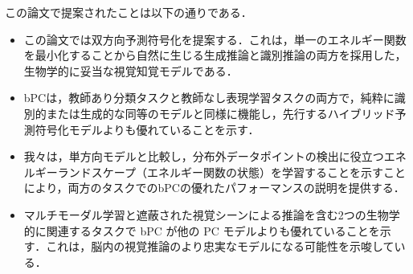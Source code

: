 \documentclass[a4paper, titlepage]{jsarticle}
\begin{document}
\par
この論文で提案されたことは以下の通りである．
\begin{itemize}
   \item この論文では双方向予測符号化を提案する．これは，単一のエネルギー関数を最小化することから自然に生じる生成推論と識別推論の両方を採用した，生物学的に妥当な視覚知覚モデルである．
   \item bPCは，教師あり分類タスクと教師なし表現学習タスクの両方で，純粋に識別的または生成的な同等のモデルと同様に機能し，先行するハイブリッド予測符号化モデルよりも優れていることを示す．
   \item 我々は，単方向モデルと比較し，分布外データポイントの検出に役立つエネルギーランドスケープ（エネルギー関数の状態）を学習することを示すことにより，両方のタスクでのbPCの優れたパフォーマンスの説明を提供する．
   \item マルチモーダル学習と遮蔽された視覚シーンによる推論を含む2つの生物学的に関連するタスクで bPC が他の PC モデルよりも優れていることを示す．これは，脳内の視覚推論のより忠実なモデルになる可能性を示唆している．
\end{itemize}
\end{document}
